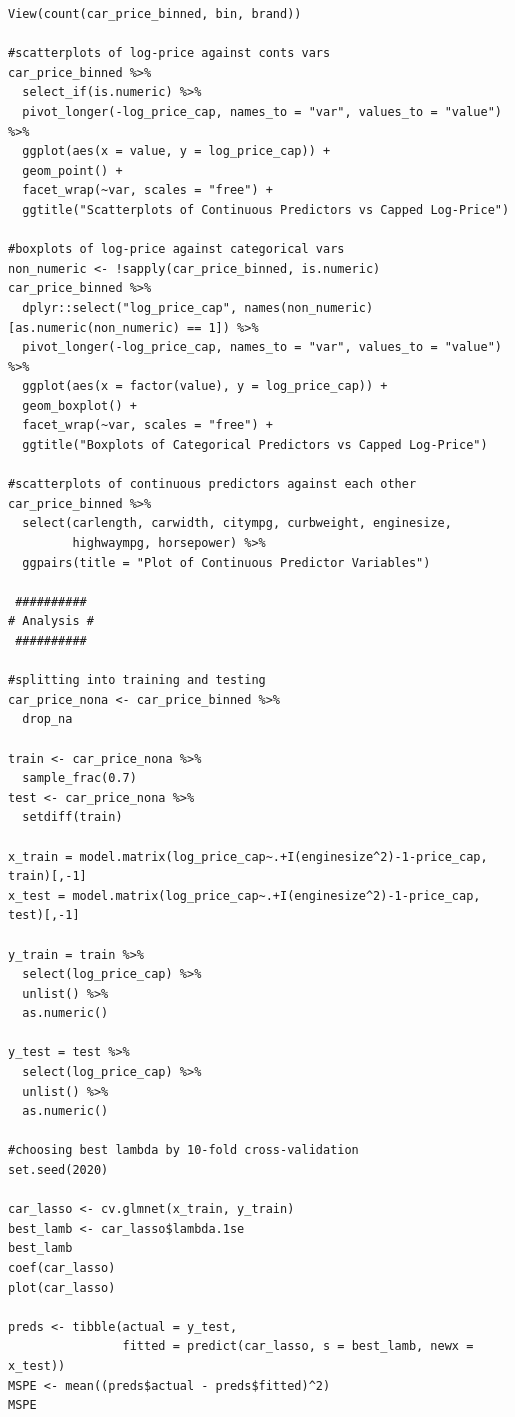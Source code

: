 \documentclass[a4paper, 10pt, titlepage]{article}
\begin{document}
\begin{lstlisting}[basicstyle = \footnotesize \ttfamily]
View(count(car_price_binned, bin, brand))

#scatterplots of log-price against conts vars
car_price_binned %>%
  select_if(is.numeric) %>%
  pivot_longer(-log_price_cap, names_to = "var", values_to = "value") %>%
  ggplot(aes(x = value, y = log_price_cap)) +
  geom_point() +
  facet_wrap(~var, scales = "free") +
  ggtitle("Scatterplots of Continuous Predictors vs Capped Log-Price")

#boxplots of log-price against categorical vars
non_numeric <- !sapply(car_price_binned, is.numeric)
car_price_binned %>%
  dplyr::select("log_price_cap", names(non_numeric)[as.numeric(non_numeric) == 1]) %>%
  pivot_longer(-log_price_cap, names_to = "var", values_to = "value") %>%
  ggplot(aes(x = factor(value), y = log_price_cap)) +
  geom_boxplot() +
  facet_wrap(~var, scales = "free") +
  ggtitle("Boxplots of Categorical Predictors vs Capped Log-Price")

#scatterplots of continuous predictors against each other
car_price_binned %>%
  select(carlength, carwidth, citympg, curbweight, enginesize,
         highwaympg, horsepower) %>%
  ggpairs(title = "Plot of Continuous Predictor Variables")

 ##########
# Analysis #
 ##########

#splitting into training and testing
car_price_nona <- car_price_binned %>%
  drop_na

train <- car_price_nona %>%
  sample_frac(0.7)
test <- car_price_nona %>%
  setdiff(train)

x_train = model.matrix(log_price_cap~.+I(enginesize^2)-1-price_cap, train)[,-1]
x_test = model.matrix(log_price_cap~.+I(enginesize^2)-1-price_cap, test)[,-1]

y_train = train %>%
  select(log_price_cap) %>%
  unlist() %>%
  as.numeric()

y_test = test %>%
  select(log_price_cap) %>%
  unlist() %>%
  as.numeric()

#choosing best lambda by 10-fold cross-validation
set.seed(2020)

car_lasso <- cv.glmnet(x_train, y_train)
best_lamb <- car_lasso$lambda.1se
best_lamb
coef(car_lasso)
plot(car_lasso)

preds <- tibble(actual = y_test, 
                fitted = predict(car_lasso, s = best_lamb, newx = x_test))
MSPE <- mean((preds$actual - preds$fitted)^2)
MSPE
\end{lstlisting}
\end{document}
